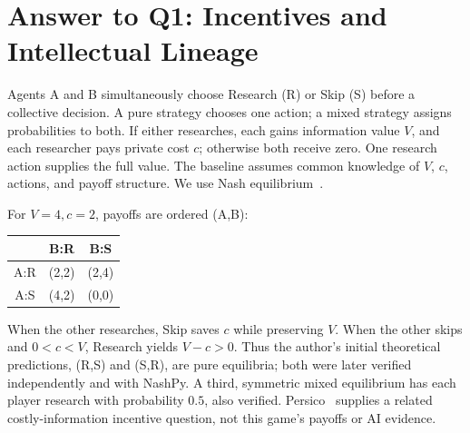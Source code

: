 \section{Answer to Q1: Incentives and Intellectual Lineage}
Agents A and B simultaneously choose Research (R) or Skip (S) before a collective decision. A pure strategy chooses one action; a mixed strategy assigns probabilities to both. If either researches, each gains information value \(V\), and each researcher pays private cost \(c\); otherwise both receive zero. One research action supplies the full value. The baseline assumes common knowledge of \(V\), \(c\), actions, and payoff structure. We use Nash equilibrium~\cite{nash1950}.

For \(V=4,c=2\), payoffs are ordered (A,B):
\begin{center}
\begin{tabular}{c|cc}
 & B:R & B:S\\\hline
A:R & (2,2) & (2,4)\\
A:S & (4,2) & (0,0)
\end{tabular}
\end{center}
When the other researches, Skip saves \(c\) while preserving \(V\). When the other skips and \(0<c<V\), Research yields \(V-c>0\). Thus the author's initial theoretical predictions, (R,S) and (S,R), are pure equilibria; both were later verified independently and with NashPy. A third, symmetric mixed equilibrium has each player research with probability \(0.5\), also verified. Persico~\cite{persico2004} supplies a related costly-information incentive question, not this game's payoffs or AI evidence.
